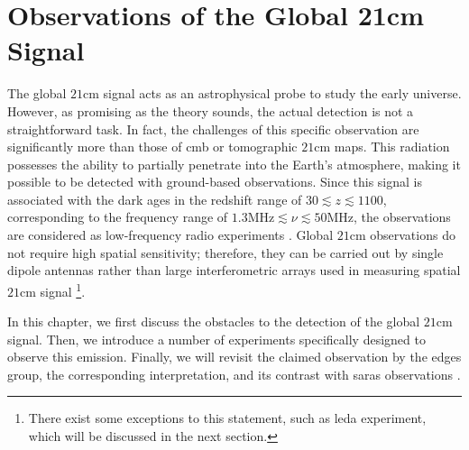 \documentclass[12pt, TexShade, letterpaper]{report}
\begin{document}
\chapter{Observations of the Global 21cm Signal}
\label{chap:observations}
The global $\mathrm{21cm}$ signal acts as an astrophysical probe to study the early universe. However, as promising as the theory sounds, the actual detection is not a straightforward task. In fact, the challenges of this specific observation are significantly more than those of \gls{cmb} or tomographic $\mathrm{21cm}$ maps. 
This radiation possesses the ability to partially penetrate into the Earth's atmosphere, making it possible to be detected with ground-based observations. Since this signal is associated with the dark ages in the redshift range of $30 \lesssim z \lesssim 1100$, corresponding to the frequency range of $\mathrm{1.3 MHz}\lesssim \nu \lesssim \mathrm{50 MHz}$, the observations are considered as low-frequency radio experiments \cite{thesis_pamela, thesis_moso}.
Global $\mathrm{21cm}$ observations do not require high spatial sensitivity; therefore, they can be carried out by single dipole antennas rather than large interferometric arrays used in measuring spatial $\mathrm{21cm}$ signal \cite{thesis_shedding} \footnote{There exist some exceptions to this statement, such as \gls{leda} experiment, which will be discussed in the next section.}.\par
In this chapter, we first discuss the obstacles to the detection of the global $\mathrm{21cm}$ signal. Then, we introduce a number of experiments specifically designed to observe this emission. Finally, we will revisit the claimed observation by the \gls{edges} group, the corresponding interpretation, and its contrast with \gls{saras} observations \cite{saras_curse_edges}.
\end{document}
